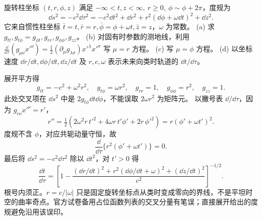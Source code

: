 \begin{exercise}
旋转柱坐标 $(t,r,\phi,z)$ 满足 $-\infty<t,z<\infty,\ r\ge0,\ \phi\sim\phi+2\pi$，度规为
\[
\dd s^2=-c^2\dd\tau^2=-c^2\dd t^2+\dd r^2+r^2(\dd\phi+\omega\dd t)^2+\dd z^2.
\]
它来自惯性柱坐标 $\bar t=t,\bar r=r,\bar\phi=\phi+\omega t,\bar z=z$，$\omega$ 为常数。
(a) 求 $g_{tt},g_{t\phi}=g_{\phi t},g_{rr},g_{\phi\phi},g_{zz}$。
(b) 对固有时参数的测地线，利用
$\frac{\dd}{\dd\tau}(g_{\mu\nu}x'^\nu)=\frac12(\partial_\mu g_{\lambda\sigma})x'^\lambda x'^\sigma$
写 $\mu=r$ 方程。
(c) 写 $\mu=\phi$ 方程。
(d) 以坐标速度 $\dd r/\dd t,\dd\phi/\dd t,\dd z/\dd t$ 及 $r,c,\omega$ 表示未来向类时轨道的 $\dd t/\dd\tau$。
\end{exercise}
\begin{solution}
展开平方得
\[
g_{tt}=-c^2+\omega^2r^2,\quad
g_{t\phi}=\omega r^2,\quad
g_{rr}=1,\quad g_{\phi\phi}=r^2,\quad g_{zz}=1 .
\]
此处交叉项在 $\dd s^2$ 中是 $2g_{t\phi}\dd t\dd\phi$，不能误取 $2\omega r^2$ 为矩阵元。
以撇号表 $\dd/\dd\tau$，因为 $g_{r\nu}x'^\nu=r'$，
\[
r''=\tfrac12(2\omega^2r\,t'^2+4\omega r\,t'\phi'+2r\,\phi'^2)
=r(\phi'+\omega t')^2 .
\]
度规不含 $\phi$，对应共轭动量守恒，故
\[
\frac{\dd}{\dd\tau}\{r^2(\phi'+\omega t')\}=0.
\]
最后将 $\dd s^2=-c^2\dd\tau^2$ 除以 $\dd t^2$，对 $t'>0$ 得
\[
\frac{\dd t}{\dd\tau}
=\left[1-\frac{(\dd r/\dd t)^2+r^2(\dd\phi/\dd t+\omega)^2+(\dd z/\dd t)^2}{c^2}\right]^{-1/2}.
\]
根号内须正。$r=c/|\omega|$ 只是固定旋转坐标点从类时变成零向的界线，不是平坦时空的曲率奇点。官方试卷备用占位函数列表的交叉分量有笔误；直接展开给出的度规避免沿用该误印。
\end{solution}

